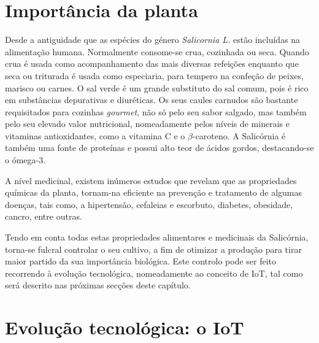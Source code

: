 \section{Importância da planta}



Desde a antiguidade que as espécies do género \textit{Salicornia L.} estão incluídas na alimentação humana. Normalmente consome-se crua, cozinhada ou seca. Quando crua é usada como acompanhamento das mais diversas refeições enquanto que seca ou triturada é usada como especiaria, para tempero na confeção de peixes, marisco ou carnes. O sal verde é um grande substituto do sal comum, pois é rico em substâncias depurativas e diuréticas. Os seus caules carnudos são bastante requisitados para cozinhas \textit{gourmet}, não só pelo seu sabor salgado, mas também pelo seu elevado valor nutricional\cite{Filomena2009}, nomeadamente pelos níveis de minerais e vitaminas antioxidantes, como a  vitamina C e o $\beta$-caroteno. A Salicórnia é também uma fonte de proteínas e possui alto teor de ácidos gordos, destacando-se o  ómega-3\cite{Ventura2011}. 

A nível medicinal, existem inúmeros estudos que revelam que as propriedades químicas da planta, tornam-na eficiente na prevenção e tratamento de algumas doenças, tais como, a hipertensão, cefaleias e escorbuto, diabetes, obesidade, cancro, entre outras\cite{Wang2012}.

Tendo em conta todas estas propriedades alimentares e medicinais da Salicórnia, torna-se fulcral controlar o seu cultivo, a fim de otimizar a produção para tirar maior partido da sua importância biológica. Este controlo pode ser feito recorrendo à evolução tecnológica, nomeadamente ao conceito de \ac{IoT}, tal como será descrito nas próximas secções deste capítulo. 


















\section{Evolução tecnológica: o \acs{IoT}}


